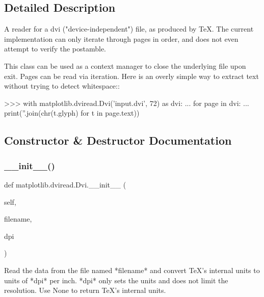 \subsection{Detailed Description}
\begin{DoxyVerb}A reader for a dvi ("device-independent") file, as produced by TeX.
The current implementation can only iterate through pages in order,
and does not even attempt to verify the postamble.

This class can be used as a context manager to close the underlying
file upon exit. Pages can be read via iteration. Here is an overly
simple way to extract text without trying to detect whitespace::

    >>> with matplotlib.dviread.Dvi('input.dvi', 72) as dvi:
    ...     for page in dvi:
    ...         print(''.join(chr(t.glyph) for t in page.text))
\end{DoxyVerb}
 

\subsection{Constructor \& Destructor Documentation}
\mbox{\label{classmatplotlib_1_1dviread_1_1Dvi_a2c99516bd578ef5b8599cbd7e197a292}} 
\subsubsection{\texorpdfstring{\+\_\+\+\_\+init\+\_\+\+\_\+()}{\_\_init\_\_()}}
{\footnotesize\ttfamily def matplotlib.\+dviread.\+Dvi.\+\_\+\+\_\+init\+\_\+\+\_\+ (\begin{DoxyParamCaption}\item[{}]{self,  }\item[{}]{filename,  }\item[{}]{dpi }\end{DoxyParamCaption})}

\begin{DoxyVerb}Read the data from the file named *filename* and convert
TeX's internal units to units of *dpi* per inch.
*dpi* only sets the units and does not limit the resolution.
Use None to return TeX's internal units.
\end{DoxyVerb}
 

